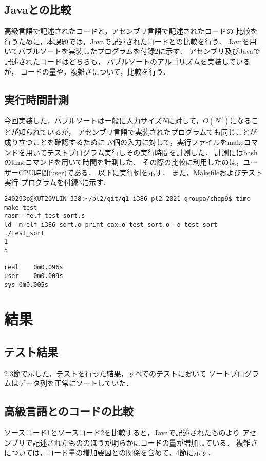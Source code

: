 \documentclass[a4j]{jarticle}
\begin{document}
\subsection{Javaとの比較}
高級言語で記述されたコードと，アセンブリ言語で記述されたコードの
比較を行うために，本課題では，Javaで記述されたコードとの比較を行う．
Javaを用いてバブルソートを実装したプログラムを付録2に示す．
アセンブリ及びJavaで記述されたコードはどちらも，
バブルソートのアルゴリズムを実装しているが，
コードの量や，複雑さについて，比較を行う．

\subsection{実行時間計測}
今回実装した，バブルソートは一般に入力サイズ$N$に対して，$O(N^{2})$になることが知られているが，
アセンブリ言語で実装されたプログラムでも同じことが成り立つことを確認するために
$N$個の入力に対して，実行ファイルをmakeコマンドを用いてテストプログラム実行しその実行時間を計測した．
計測にはbashのtimeコマンドを用いて時間を計測した．
その際の比較に利用したのは，ユーザーCPU時間(user)である．
以下に実行例を示す．
また，Makefileおよびテスト実行 プログラムを付録3に示す．

\begin{lstlisting}[caption=timeコマンド実行例]
  240293p@KUT20VLIN-338:~/pl2/git/q1-i386-pl2-2021-groupa/chap9$ time make test
nasm -felf test_sort.s
ld -m elf_i386 sort.o print_eax.o test_sort.o -o test_sort
./test_sort
1
5

real	0m0.096s
user	0m0.009s
sys	0m0.005s

\end{lstlisting}

\section{結果}
\subsection{テスト結果}
2.3節で示した，テストを行った結果，すべてのテストにおいて
ソートプログラムはデータ列を正常にソートしていた．

\subsection{高級言語とのコードの比較}
ソースコード1とソースコード2を比較すると，Javaで記述されたものより
アセンブリで記述されたもののほうが明らかにコードの量が増加している．
複雑さについては，コード量の増加要因との関係を含めて，4節に示す．
\end{document}
